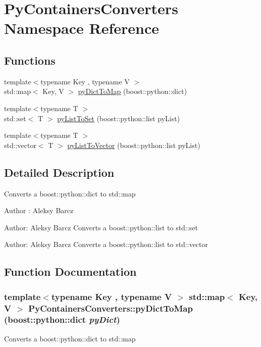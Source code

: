 \hypertarget{namespace_py_containers_converters}{
\section{PyContainersConverters Namespace Reference}
\label{namespace_py_containers_converters}
}
\subsection*{Functions}
\begin{DoxyCompactItemize}
\item 
{\footnotesize template$<$typename Key , typename V $>$ }\\std::map$<$ Key, V $>$ \hyperlink{namespace_py_containers_converters_a0299ebf5e53b19d95b2d488676fd3b5b}{pyDictToMap} (boost::python::dict)
\item 
{\footnotesize template$<$typename T $>$ }\\std::set$<$ T $>$ \hyperlink{namespace_py_containers_converters_acd8fbea72afcee1385a61c81b170098b}{pyListToSet} (boost::python::list pyList)
\item 
{\footnotesize template$<$typename T $>$ }\\std::vector$<$ T $>$ \hyperlink{namespace_py_containers_converters_a8f3d92c41544fc4ee156509eaaf68729}{pyListToVector} (boost::python::list pyList)
\end{DoxyCompactItemize}


\subsection{Detailed Description}
Converts a boost::python::dict to std::map

\begin{DoxyAuthor}{Author}
: Aleksy Barcz
\end{DoxyAuthor}
Author: Aleksy Barcz Converts a boost::python::list to std::set

Author: Aleksy Barcz Converts a boost::python::list to std::vector 

\subsection{Function Documentation}
\hypertarget{namespace_py_containers_converters_a0299ebf5e53b19d95b2d488676fd3b5b}{
\subsubsection[{pyDictToMap}]{\setlength{\rightskip}{0pt plus 5cm}template$<$typename Key , typename V $>$ std::map$<$ Key, V $>$ PyContainersConverters::pyDictToMap (boost::python::dict {\em pyDict})}}
\label{namespace_py_containers_converters_a0299ebf5e53b19d95b2d488676fd3b5b}
Converts a boost::python::dict to std::map


